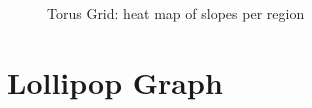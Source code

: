  \begin{figure}
     \centering
     \caption{Torus Grid: heat map of slopes per region}
     \label{fig:torusgraphslopes}
 \end{figure}

 \section{Lollipop Graph}\label{sec:lollipopgraph}
